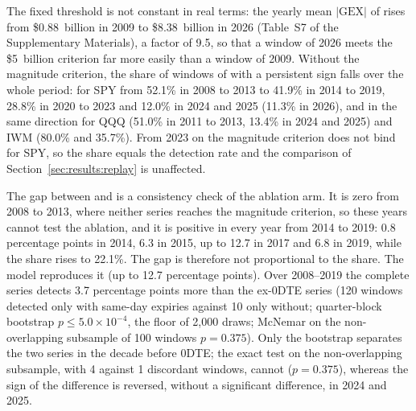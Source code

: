The fixed threshold is not constant in real terms: the yearly mean $|\mathrm{GEX}|$ of  rises from \$0.88~billion in 2009 to \$8.38~billion in 2026 (Table~S7 of the Supplementary Materials), a factor of 9.5, so that a window of 2026 meets the \$5~billion criterion far more easily than a window of 2009. Without the magnitude criterion, the share of windows of  with a persistent sign falls over the whole period: for SPY from 52.1\% in 2008 to 2013 to 41.9\% in 2014 to 2019, 28.8\% in 2020 to 2023 and 12.0\% in 2024 and 2025 (11.3\% in 2026), and in the same direction for QQQ (51.0\% in 2011 to 2013, 13.4\% in 2024 and 2025) and IWM (80.0\% and 35.7\%). From 2023 on the magnitude criterion does not bind for SPY, so the share equals the detection rate and the comparison of Section~\ref{sec:results:replay} is unaffected.

The gap between  and  is a consistency check of the ablation arm. It is zero from 2008 to 2013, where neither series reaches the magnitude criterion, so these years cannot test the ablation, and it is positive in every year from 2014 to 2019: 0.8 percentage points in 2014, 6.3 in 2015, up to 12.7 in 2017 and 6.8 in 2019, while the share rises to 22.1\%. The gap is therefore not proportional to the share. The model reproduces it (up to 12.7 percentage points). Over 2008--2019 the complete series detects 3.7 percentage points more than the ex-0DTE series (120 windows detected only with same-day expiries against 10 only without; quarter-block bootstrap $p\le5.0\times10^{-4}$, the floor of 2{,}000 draws; McNemar on the non-overlapping subsample of 100 windows $p=0.375$). Only the bootstrap separates the two series in the decade before 0DTE; the exact test on the non-overlapping subsample, with 4 against 1 discordant windows, cannot ($p=0.375$), whereas the sign of the difference is reversed, without a significant difference, in 2024 and 2025.


